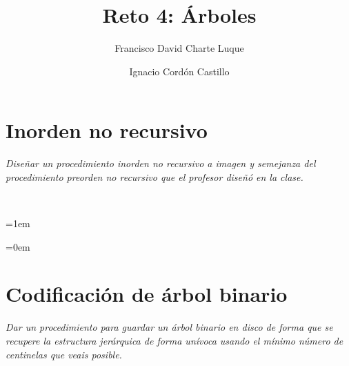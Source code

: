 \documentclass[a4paper,10pt]{scrartcl}
\title{Reto 4: Árboles}
\author{Francisco David Charte Luque\and
        Ignacio Cordón Castillo}
\date{}
\begin{document}
\maketitle
\section{Inorden no recursivo}
	\textit{Diseñar un procedimiento inorden no recursivo a imagen y semejanza
	del procedimiento preorden no recursivo que el profesor diseñó en la clase.}

 \ 
 
 \leftskip=1em
 \small
 \texttt{}
 \normalsize
 
 \leftskip=0em
 \section{Codificación de árbol binario}
 	\textit{Dar un procedimiento para guardar un árbol binario en disco de forma que se
 	recupere la estructura jerárquica de forma unívoca usando el mínimo número
 	de centinelas que veais posible.}
\end{document}
